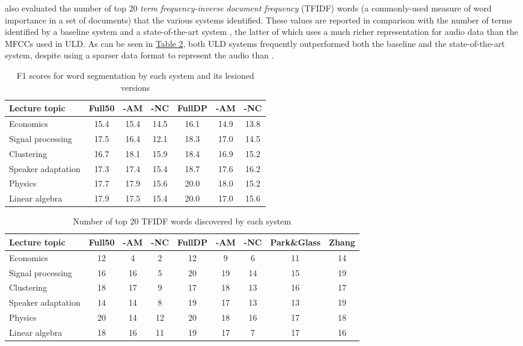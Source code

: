 \documentclass[12pt,letterpaper]{article}
\begin{document}
\citet{lee:2015} also evaluated the number of top 20 \textit{term frequency-inverse document frequency} (TFIDF) words (a commonly-used measure of word importance in a set of documents) that the various systems identified. These values are reported in comparison with the number of terms identified by a baseline system \citep{park:2008} and a state-of-the-art system \citep{zhang:2013}, the latter of which uses a much richer representation for audio data than the MFCCs used in ULD. As can be seen in  \hyperref[table3]{Table \ref*{table3}}, both ULD systems frequently outperformed both the baseline and the state-of-the-art system, despite using a sparser data format to represent the audio than \citet{zhang:2013}. 


\begin{table}
\begin{tabular}{|l||c|c|c||c|c|c|}
\hline
Lecture topic&Full50&-AM&-NC&FullDP&-AM&-NC \\
\hline \hline
Economics&15.4&15.4&14.5&16.1&14.9&13.8\\
\hline
Signal processing&17.5&16.4&12.1&18.3&17.0&14.5\\
\hline
Clustering&16.7&18.1&15.9&18.4&16.9&15.2\\
\hline
Speaker adaptation&17.3&17.4&15.4&18.7&17.6&16.2\\
\hline
Physics&17.7&17.9&15.6&20.0&18.0&15.2\\
\hline
Linear algebra&17.9&17.5&15.4&20.0&17.0&15.6\\
\hline

\end{tabular}
\caption{F1 scores for word segmentation by each system and its lesioned versions\protect\citep{lee:2015}}
\label{table2}
\end{table}

\begin{table}
\begin{tabular}{|l||c|c|c||c|c|c||c|c|}
\hline
Lecture topic&Full50&-AM&-NC&FullDP&-AM&-NC&Park\&Glass&Zhang\\
\hline \hline
Economics&12&4&2&12&9&6&11&14\\
\hline
Signal processing&16&16&5&20&19&14&15&19\\
\hline
Clustering&18&17&9&17&18&13&16&17\\
\hline
Speaker adaptation&14&14&8&19&17&13&13&19\\
\hline
Physics&20&14&12&20&18&16&17&18\\
\hline
Linear algebra&18&16&11&19&17&7&17&16\\
\hline
\end{tabular}
\caption{Number of top 20 TFIDF words discovered by each system \protect\citep{lee:2015}}
\label{table3}
\end{table}
\end{document}
